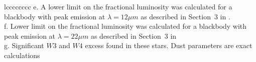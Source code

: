 \begin{deluxetable}{lcccccccc}
{e. A lower limit on the fractional luminosity was calculated  for a blackbody with peak emission at $\lambda=12\mu m$ as described in Section~3 in .\\
f. Lower limit on the fractional luminosity was calculated  for a blackbody with peak emission at $\lambda=22\mu m$ as described in Section~3 in \\
g. Significant $W3$ and $W4$ excess found in these stars. Dust parameters are exact calculations\\
} 
\label{tab:diskcandidates}
\end{deluxetable}